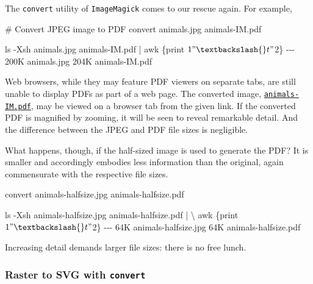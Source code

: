 \documentclass[
  11pt,
  british,
  a4paper,
]{article}
\newenvironment{Shaded}{\begin{snugshade}}{\end{snugshade}}
\newcommand{\AttributeTok}[1]{\textcolor[rgb]{0.80,0.80,0.80}{#1}}
\newcommand{\CommentTok}[1]{\textcolor[rgb]{0.50,0.62,0.50}{#1}}
\newcommand{\DataTypeTok}[1]{\textcolor[rgb]{0.87,0.87,0.75}{#1}}
\newcommand{\ExtensionTok}[1]{\textcolor[rgb]{0.80,0.80,0.80}{#1}}
\newcommand{\FunctionTok}[1]{\textcolor[rgb]{0.94,0.94,0.56}{#1}}
\newcommand{\KeywordTok}[1]{\textcolor[rgb]{0.94,0.87,0.69}{#1}}
\newcommand{\NormalTok}[1]{\textcolor[rgb]{0.80,0.80,0.80}{#1}}
\newcommand{\StringTok}[1]{\textcolor[rgb]{0.80,0.58,0.58}{#1}}
\begin{document}
The \texttt{convert} utility of \texttt{ImageMagick} comes to our rescue
again. For example,

\begin{Shaded}
\begin{Highlighting}[]
\CommentTok{\# Convert JPEG image to PDF}
\ExtensionTok{convert}\NormalTok{ animals.jpg animals{-}IM.pdf}

\FunctionTok{ls} \AttributeTok{{-}Xsh}\NormalTok{ animals.jpg animals{-}IM.pdf }\KeywordTok{|} \FunctionTok{awk} \StringTok{\textquotesingle{}\{print $1 "\textbackslash{}t" $2\}\textquotesingle{}}
\ExtensionTok{{-}{-}{-}}
\ExtensionTok{200K}\NormalTok{    animals.jpg}
\ExtensionTok{204K}\NormalTok{    animals{-}IM.pdf}
\end{Highlighting}
\end{Shaded}

Web browsers, while they may feature PDF viewers on separate tabs, are
still unable to display PDFs as part of a web page. The converted image,
\href{images/animals-IM.pdf}{\texttt{animals-IM.pdf}}, may be viewed on
a browser tab from the given link. If the converted PDF is magnified by
zooming, it will be seen to reveal remarkable detail. And the difference
between the JPEG and PDF file sizes is negligible.

What happens, though, if the half-sized image is used to generate the
PDF? It is smaller and accordingly embodies less information than the
original, again commensurate with the respective file sizes.

\begin{Shaded}
\begin{Highlighting}[]
\ExtensionTok{convert}\NormalTok{ animals{-}halfsize.jpg animals{-}halfsize.pdf}

\FunctionTok{ls} \AttributeTok{{-}Xsh}\NormalTok{ animals{-}halfsize.jpg animals{-}halfsize.pdf }\KeywordTok{|} \DataTypeTok{\textbackslash{}}
\FunctionTok{awk} \StringTok{\textquotesingle{}\{print $1 "\textbackslash{}t" $2\}\textquotesingle{}}
\ExtensionTok{{-}{-}{-}}
\ExtensionTok{64K}\NormalTok{     animals{-}halfsize.jpg}
\ExtensionTok{64K}\NormalTok{     animals{-}halfsize.pdf}
\end{Highlighting}
\end{Shaded}

Increasing detail demands larger file sizes: there is no free lunch.

\hypertarget{raster-to-svg-with-convert}{%
\subsubsection{\texorpdfstring{Raster to SVG with
\texttt{convert}}{Raster to SVG with convert}}\label{raster-to-svg-with-convert}}
\end{document}
